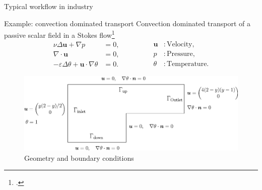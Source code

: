 \documentclass[aspectratio=169]{beamer}
\begin{document}
\begin{frame}{Typical workflow in industry}
\begin{itemize}
\begin{figure}[t]
\begin{subfigure}[t]{0.4\textwidth}
		\end{subfigure}
	\end{figure}
	\end{itemize}
\end{frame}

\begin{frame}{Example: convection dominated transport}
	Convection dominated transport of a passive scalar field in a Stokes flow\footcite{volker2017review}
	\begin{equation*}
		\begin{aligned}
			\nu \Delta \bm{u} + \nabla p &=0, \\
			\nabla \cdot \bm{u} &=0, \\
			-\varepsilon \Delta \theta + \bm{u} \cdot \nabla \theta &=0.
		\end{aligned} \qquad \qquad 
	\begin{aligned}
		\bm{u} &: \text{Velocity}, \\
		p &: \text{Pressure}, \\
		\theta &: \text{Temperature}.
	\end{aligned}
	\end{equation*}
	\begin{figure}
		\centering
		\includegraphics[width=.7\textwidth]{channel_convection_T.eps}
		\caption*{Geometry and boundary conditions}
	\end{figure}
\end{frame}
\end{document}
